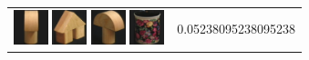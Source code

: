 \begin{figure}[tbp]
\begin{tabular}{m{11cm} | m{3cm} |}
\includegraphics[width=1cm]{coil/beeld-5.eps}
\includegraphics[width=1cm]{coil/beeld-45.eps}
\includegraphics[width=1cm]{coil/beeld-4.eps}
\includegraphics[width=1cm]{coil/beeld-62.eps}
& {\scriptsize 0.05238095238095238}
\\
\end{tabular}
\vspace{5pt}
\end{figure}

